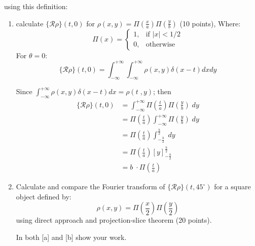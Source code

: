 \documentclass[12pt,twoside]{article}
\begin{document}
  using this definition:
    \begin{enumerate}
        \item calculate $\{ \mathcal{R} \rho \}(t, 0)$ for $\rho(x, y) = \Pi\left(\frac{x}{a}\right)\Pi\left(\frac{y}{b}\right)$ (10 points), Where:
        \[
        \Pi(x) = 
        \begin{cases} 
        1, & \text{if } |x| < 1/2 \\ 
        0, & \text{otherwise}
        \end{cases}
        \]
        For $\theta=0$:
	\begin{equation}
            \{ \mathcal{R} \rho \}(t, 0) = \int_{-\infty}^{+\infty} \int_{-\infty}^{+\infty} \rho(x, y) \delta(x  - t) dx dy
	\end{equation}

	Since $ \int_{-\infty}^{+\infty}  \rho (x ,y) \delta(x  - t) dx =  \rho (t \; , y)$; then 
	 \begin{align*}
	 	 	\{ \mathcal{R} \rho \}(t, 0) &= \int_{-\infty}^{+\infty} \Pi(\frac{t}{a}) \Pi(\frac{y}{b}) \; dy \\
			&= \Pi(\frac{t}{a}) \int_{-\infty}^{+\infty}  \Pi(\frac{y}{b}) \; dy \\
			&= \Pi(\frac{t}{a}) \int_{-\frac{b}{2}}^{\frac{b}{2}} \; dy \\
			&= \Pi(\frac{t}{a})  [ y ]_{-\frac{b}{2}}^{\frac{b}{2}}  \\
			&= b \; \cdot  \Pi(\frac{t}{a})  
	 \end{align*}

        \item Calculate and compare the Fourier transform of $\{ \mathcal{R} \rho \}(t, 45^{\circ})$ for a square object defined by:
        \[
        \rho(x, y) = \Pi\left(\frac{x}{2}\right)\Pi\left(\frac{y}{2}\right)
        \]
        using direct approach and projection-slice theorem (20 points).
        
        In both [a] and [b] show your work.
        

\end{enumerate}
\end{document}
